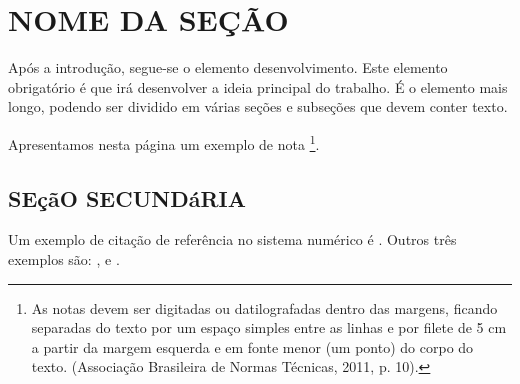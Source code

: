 \documentclass[
  oneside, %
  english,
  brazil
]{abntbibufjf}
\begin{document}
\chapter{NOME DA SEÇÃO}

Após a introdução, segue-se o elemento desenvolvimento. Este elemento obrigatório é que irá desenvolver a ideia principal do trabalho.
É o elemento mais longo, podendo ser dividido em várias seções %
e subseções que devem conter texto.

Apresentamos nesta página um exemplo de nota \footnote{As notas devem ser digitadas ou datilografadas dentro das margens, ficando separadas do texto
  por um espaço simples entre as linhas e por filete de 5 cm a partir da margem esquerda e em fonte menor (um ponto) do corpo do texto. (Associação
  Brasileira de Normas Técnicas, 2011, p. 10).}.




\section{SEçãO SECUNDáRIA} %

Um exemplo de citação de referência no sistema numérico é \cite{disp2019}. Outros três exemplos são: \cite{Bauman99}, \cite{vet18} e
\cite{Aguiar2009}.




\end{document}
